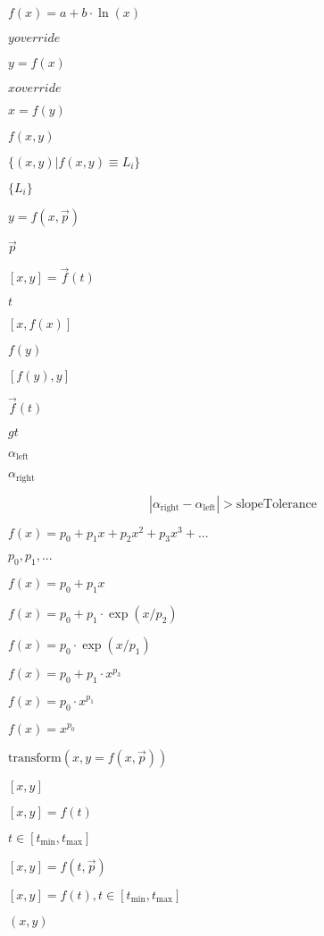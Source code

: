\documentclass{article}
\begin{document}
$ f(x)=a+b\cdot \ln(x) $
\pagebreak

$ yoverride $
\pagebreak

$ y=f(x) $
\pagebreak

$ xoverride $
\pagebreak

$ x=f(y) $
\pagebreak

$ f(x,y) $
\pagebreak

$ \{(x,y)|f(x,y)\equiv L_i\} $
\pagebreak

$ \{L_i\} $
\pagebreak

$ y=f(x, \vec{p}) $
\pagebreak

$ \vec{p} $
\pagebreak

$ [x,y]=\vec{f}(t) $
\pagebreak

$ t $
\pagebreak

$ [x, f(x)] $
\pagebreak

$ f(y) $
\pagebreak

$ [f(y), y] $
\pagebreak

$ \vec{f}(t) $
\pagebreak

$ gt $
\pagebreak

$ \alpha_{\mbox{left}} $
\pagebreak

$ \alpha_{\mbox{right}} $
\pagebreak

\[ \left|\alpha_{\mbox{right}}-\alpha_{\mbox{left}}\right|>\mbox{slopeTolerance} \]
\pagebreak

$ f(x)=p_0+p_1x+p_2x^2+p_3x^3+... $
\pagebreak

$ p_0, p_1, ... $
\pagebreak

$ f(x)=p_0+p_1x $
\pagebreak

$ f(x)=p_0+p_1\cdot\exp(x/p_2) $
\pagebreak

$ f(x)=p_0\cdot\exp(x/p_1) $
\pagebreak

$ f(x)=p_0+p_1\cdot x^{p_3} $
\pagebreak

$ f(x)=p_0\cdot x^{p_1} $
\pagebreak

$ f(x)= x^{p_0} $
\pagebreak

$ \mbox{transform}\left(x, y=f(x, \vec{p})\right) $
\pagebreak

$ [x,y] $
\pagebreak

$ [x,y]=f(t) $
\pagebreak

$ t \in \left[t_\text{min}, t_\text{max}\right] $
\pagebreak

$ [x,y]=f(t, \vec{p}) $
\pagebreak

$ [x,y]=f(t), t \in \left[t_\text{min}, t_\text{max}\right] $
\pagebreak

$ (x,y) $
\pagebreak
\end{document}
